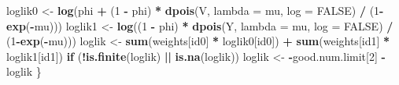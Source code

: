 \documentclass[]{article}
\newenvironment{Shaded}{\begin{snugshade}}{\end{snugshade}}
\newcommand{\KeywordTok}[1]{\textcolor[rgb]{0.13,0.29,0.53}{\textbf{#1}}}
\newcommand{\DataTypeTok}[1]{\textcolor[rgb]{0.13,0.29,0.53}{#1}}
\newcommand{\DecValTok}[1]{\textcolor[rgb]{0.00,0.00,0.81}{#1}}
\newcommand{\StringTok}[1]{\textcolor[rgb]{0.31,0.60,0.02}{#1}}
\newcommand{\OtherTok}[1]{\textcolor[rgb]{0.56,0.35,0.01}{#1}}
\newcommand{\ControlFlowTok}[1]{\textcolor[rgb]{0.13,0.29,0.53}{\textbf{#1}}}
\newcommand{\OperatorTok}[1]{\textcolor[rgb]{0.81,0.36,0.00}{\textbf{#1}}}
\newcommand{\NormalTok}[1]{#1}
\begin{document}
\begin{Shaded}
\begin{Highlighting}[]
{{{{\NormalTok{        loglik0 <-}\StringTok{ }\KeywordTok{log}\NormalTok{(phi }\OperatorTok{+}\StringTok{ }\NormalTok{(}\DecValTok{1} \OperatorTok{-}\StringTok{ }\NormalTok{phi) }\OperatorTok{*}\StringTok{ }\KeywordTok{dpois}\NormalTok{(V, }\DataTypeTok{lambda =}\NormalTok{ mu, }\DataTypeTok{log =} \OtherTok{FALSE}\NormalTok{) }\OperatorTok{/}\StringTok{ }\NormalTok{(}\DecValTok{1}\OperatorTok{-}\KeywordTok{exp}\NormalTok{(}\OperatorTok{-}\NormalTok{mu)))}
\NormalTok{        loglik1 <-}\StringTok{ }\KeywordTok{log}\NormalTok{((}\DecValTok{1} \OperatorTok{-}\StringTok{ }\NormalTok{phi) }\OperatorTok{*}\StringTok{ }\KeywordTok{dpois}\NormalTok{(Y, }\DataTypeTok{lambda =}\NormalTok{ mu, }\DataTypeTok{log =} \OtherTok{FALSE}\NormalTok{) }\OperatorTok{/}\StringTok{ }\NormalTok{(}\DecValTok{1}\OperatorTok{-}\KeywordTok{exp}\NormalTok{(}\OperatorTok{-}\NormalTok{mu)))}
\NormalTok{        loglik <-}\StringTok{ }\KeywordTok{sum}\NormalTok{(weights[id0] }\OperatorTok{*}\StringTok{ }\NormalTok{loglik0[id0]) }\OperatorTok{+}\StringTok{ }\KeywordTok{sum}\NormalTok{(weights[id1] }\OperatorTok{*}\StringTok{ }\NormalTok{loglik1[id1])}
        \ControlFlowTok{if}\NormalTok{ (}\OperatorTok{!}\KeywordTok{is.finite}\NormalTok{(loglik) }\OperatorTok{||}\StringTok{ }\KeywordTok{is.na}\NormalTok{(loglik))}
\NormalTok{            loglik <-}\StringTok{ }\OperatorTok{-}\NormalTok{good.num.limit[}\DecValTok{2}\NormalTok{]}
        \OperatorTok{-}\NormalTok{loglik}
\NormalTok{    \}}

}}}}
\end{Highlighting}
\end{Shaded}
\end{document}
